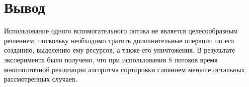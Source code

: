 \section*{Вывод}
Использование одного вспомогательного потока не является целесообразным решением, поскольку необходимо тратить дополнительные операции по его созданию, выделению ему ресурсов, а также его уничтожения. В результате эксперимента было получено, что при использовании 8 потоков время многопоточной реализации алгоритма сортировки слиянием меньше остальных рассмотренных случаев. 